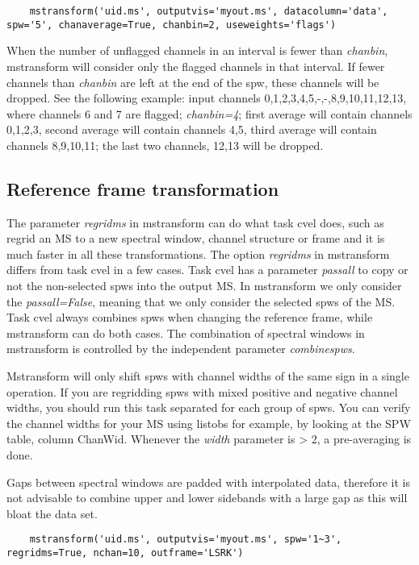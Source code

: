 \begin{verbatim}
    mstransform('uid.ms', outputvis='myout.ms', datacolumn='data', spw='5', chanaverage=True, chanbin=2, useweights='flags')
\end{verbatim}

When the number of unflagged channels in an interval is fewer than {\it chanbin}, mstransform will consider only the flagged channels
in that interval. If fewer  channels than {\it chanbin} are left at the end of the spw, these channels will be dropped.
See the following example: input channels 0,1,2,3,4,5,-,-,8,9,10,11,12,13, where channels 6 and 7 are flagged;
{\it chanbin=4}; first average will contain channels 0,1,2,3, second average will contain channels 4,5, third average will
contain channels 8,9,10,11; the last two channels, 12,13 will be dropped.


\subsection{Reference frame transformation}
The parameter {\it regridms} in mstransform can do what task cvel does, such as
regrid an MS to a new spectral window, channel structure or frame and it is
much faster in all these transformations. The option {\it regridms} in
mstransform differs from task cvel in a few cases. Task cvel has a parameter {\it passall} 
to copy or not the non-selected spws into the output MS. In mstransform we only consider 
the {\it passall=False}, meaning that we only consider the
selected spws of the MS. Task cvel always combines spws when changing the reference
frame, while mstransform can do both cases. The combination of spectral windows in mstransform
is controlled by the independent parameter {\it combinespws}.

Mstransform will only shift spws with channel widths of the same sign in a
single operation. If you are regridding spws with mixed positive and negative channel widths, 
you should run this task separated for each group of spws. You can verify the channel widths 
for your MS using listobs for example, by looking at the SPW table, column
ChanWid. Whenever the {\it width} parameter is > 2, a pre-averaging is done. 

Gaps between spectral windows are padded with interpolated data, therefore it is
not advisable to combine upper and lower sidebands with a large gap as this will
bloat the data set. 

\begin{verbatim}
    mstransform('uid.ms', outputvis='myout.ms', spw='1~3', regridms=True, nchan=10, outframe='LSRK')
\end{verbatim}

